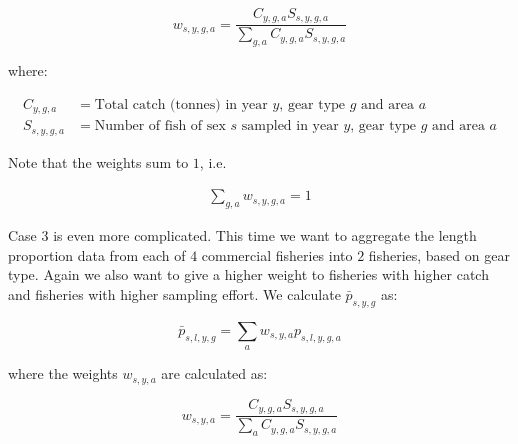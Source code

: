 \documentclass[12pt,a4paper]{article}
\begin{document}
\begin{equation}
w_{s,y,g,a} = \frac{ C_{y,g,a} S_{s,y,g,a} }{\sum_{g,a} C_{y,g,a} S_{s,y,g,a} }
\end{equation}

where:

\begin{align}
C_{y,g,a} &= \text{Total catch (tonnes) in year $y$, gear type $g$ and area $a$} \\
S_{s,y,g,a} &= \text{Number of fish of sex $s$ sampled in year $y$, gear type $g$ and area $a$}
\end{align}

Note that the weights sum to $1$, i.e.

\begin{align}
\sum_{g,a} w_{s,y,g,a} = 1
\end{align}

Case 3 is even more complicated. This time we want to aggregate the length proportion data from each of $4$ commercial fisheries into $2$ fisheries, based on gear type. Again we also want to give a higher weight to fisheries with higher catch and fisheries with higher sampling effort. We calculate $\bar{p}_{s,y,g}$ as:

\begin{equation}
\bar{p}_{s,l,y,g} = \sum_{a} w_{s,y,a} p_{s,l,y,g,a}
\end{equation}

where the weights $w_{s,y,a}$ are calculated as:

\begin{equation}
w_{s,y,a} = \frac{ C_{y,g,a} S_{s,y,g,a} }{\sum_{a} C_{y,g,a} S_{s,y,g,a} }
\end{equation}
\end{document}
